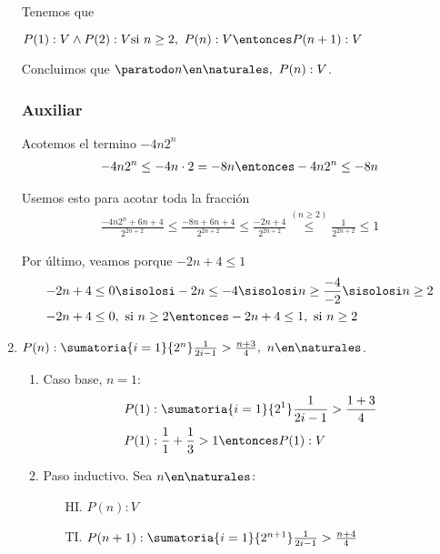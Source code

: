 \begin{enumerate}[label=\roman*)]
        Tenemos que

        $P(1): V \land P(2): V \\
          \text{si } n \geq 2, \ P(n): V \entonces P(n+1): V$

        Concluimos que $\paratodo n \en \naturales, \ P(n): V$.

        \subsubsection*{Auxiliar}
        Acotemos el termino $-4n 2^n$
        \begin{align*}
          -4n 2^n \leq -4n \cdot 2 = -8n \entonces -4n 2^n \leq -8n
        \end{align*}

        Usemos esto para acotar toda la fracción
        \begin{align*}
          \frac{-4n 2^n + 6n + 4}{2^{2n+2}} \leq \frac{-8n + 6n + 4}{2^{2n+2}} \leq \frac{-2n + 4}{2^{2n+2}}
          \overset{(n \geq 2)}{\leq} \frac{1}{2^{2n+2}} \leq 1
        \end{align*}

        Por último, veamos porque $-2n+4 \leq 1$
        \begin{align*}
          -2n + 4 & \leq 0 \sisolosi -2n \leq -4 \sisolosi n \geq \frac{-4}{-2}
          \sisolosi n \geq 2                                                                    \\
          -2n + 4 & \leq 0, \text{ si } n \geq 2 \entonces -2n + 4 \leq 1, \text{ si } n \geq 2
        \end{align*}

  \item $P(n):  \sumatoria{i=1}{2^n} \frac{1}{2i-1} > \frac{n+3}{4}, \ n \en \naturales$.
        \begin{enumerate}[label=\arabic*)]
          \item Caso base, $n = 1$:
                \begin{align*}
                  P(1) & : \sumatoria{i=1}{2^1} \frac{1}{2i-1} > \frac{1+3}{4} \\
                  P(1) & : \frac{1}{1} + \frac{1}{3} > 1  \entonces P(1): V
                \end{align*}

          \item Paso inductivo. Sea $n \en \naturales$:
                \begin{enumerate}
                  \item[HI.] $P(n): V$
                  \item[TI.] $P(n+1):  \sumatoria{i=1}{2^{n+1}} \frac{1}{2i-1} > \frac{n+4}{4}$
                \end{enumerate}


\end{enumerate}
\end{enumerate}
